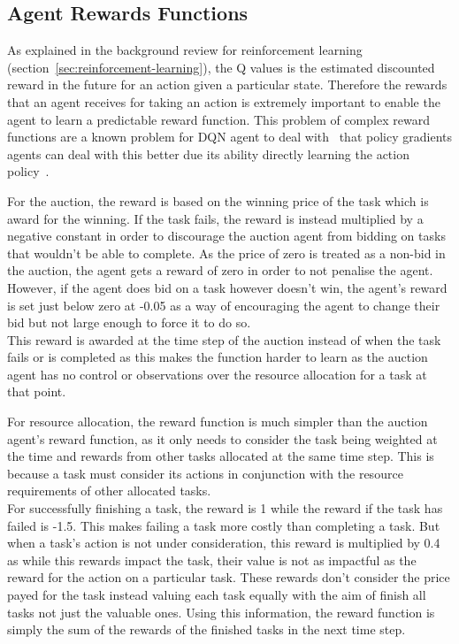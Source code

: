 \subsection{Agent Rewards Functions}\label{subsec:agent-rewards-functions}
As explained in the background review for reinforcement learning (section~\ref{sec:reinforcement-learning}),
the Q values is the estimated discounted reward in the future for an action given a particular state. Therefore the
rewards that an agent receives for taking an action is extremely important to enable the agent to learn a predictable
reward function. This problem of complex reward functions are a known problem for DQN agent to deal with~\citep{atari}
that policy gradients agents can deal with this better due its ability directly learning the action
policy~\citep{Sutton1998}.

For the auction, the reward is based on the winning price of the task which is award for the winning. If the
task fails, the reward is instead multiplied by a negative constant in order to discourage the auction agent from
bidding on tasks that wouldn't be able to complete. As the price of zero is treated as a non-bid in the auction, the
agent gets a reward of zero in order to not penalise the agent. However, if the agent does bid on a task however
doesn't win, the agent's reward is set just below zero at -0.05 as a way of encouraging the agent to change their bid
but not large enough to force it to do so. \\
This reward is awarded at the time step of the auction instead of when the task fails or is completed as this makes the
function harder to learn as the auction agent has no control or observations over the resource allocation for a task at
that point.

For resource allocation, the reward function is much simpler than the auction agent's reward function, as it only needs
to consider the task being weighted at the time and rewards from other tasks allocated at the same time step. This is
because a task must consider its actions in conjunction with the resource requirements of other allocated tasks. \\
For successfully finishing a task, the reward is 1 while the reward if the task has failed is -1.5. This makes
failing a task more costly than completing a task. But when a task's action is not under consideration, this reward is
multiplied by 0.4 as while this rewards impact the task, their value is not as impactful as the reward for the action
on a particular task. These rewards don't consider the price payed for the task instead valuing each task equally with
the aim of finish all tasks not just the valuable ones. Using this information,
the reward function is simply the sum of the rewards of the finished tasks in the next time step.

